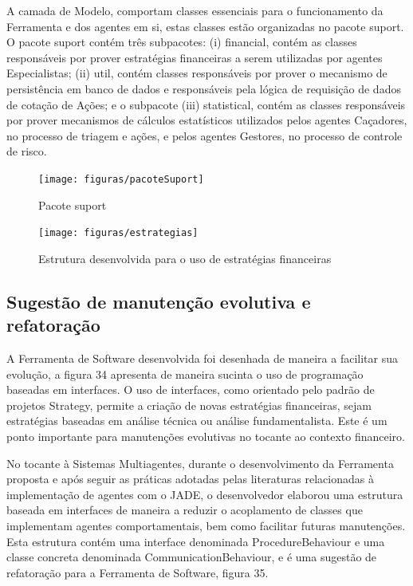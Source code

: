 A camada de Modelo, comportam classes  essenciais para o funcionamento da Ferramenta e dos agentes em si, estas classes estão organizadas no pacote suport. O pacote suport contém três subpacotes: (i) financial, contém as classes responsáveis por prover estratégias financeiras a serem utilizadas por agentes Especialistas; (ii) util, contém classes responsáveis por prover o mecanismo de persistência em banco de dados e responsáveis pela lógica de requisição de dados de cotação de Ações; e o subpacote (iii) statistical, contém as classes responsáveis por prover mecanismos de cálculos estatísticos utilizados pelos agentes Caçadores, no processo de triagem e ações, e pelos agentes Gestores, no processo de controle de risco.   

\begin{figure}[h]
\centering
\label{f33}
\texttt{[image: figuras/pacoteSuport]}
\caption{Pacote suport}
\end{figure}


\begin{figure}[h]
\centering
\label{f34}
\texttt{[image: figuras/estrategias]}
\caption{Estrutura desenvolvida para o uso de estratégias financeiras}
\end{figure}

\subsection{Sugestão de manutenção evolutiva e refatoração}

A Ferramenta de Software desenvolvida foi desenhada de maneira a facilitar sua evolução, a figura 34 apresenta de maneira sucinta o uso de programação baseadas em interfaces. O uso de interfaces, como orientado pelo padrão de projetos Strategy, permite a criação de novas estratégias financeiras, sejam estratégias baseadas em análise técnica ou análise fundamentalista. Este é um ponto importante para manutenções evolutivas no tocante ao contexto financeiro.

No tocante à Sistemas Multiagentes, durante o desenvolvimento da Ferramenta proposta e após seguir as práticas adotadas pelas literaturas relacionadas à implementação de agentes com o JADE, o desenvolvedor elaborou uma estrutura baseada em interfaces de maneira a reduzir o acoplamento de classes que implementam agentes comportamentais, bem como facilitar futuras manutenções. Esta estrutura contém uma interface denominada ProcedureBehaviour e uma classe concreta denominada CommunicationBehaviour, e é uma sugestão de refatoração para a Ferramenta de Software, figura 35.

